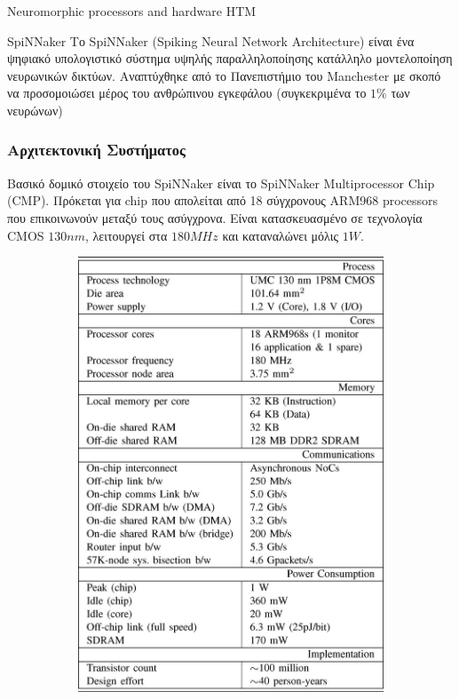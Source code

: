 \documentclass[a4paper,11pt]{article}
\begin{document}
\pagebreak
\begin{section}{Neuromorphic processors and hardware HTM}
  \begin{subsection}{SpiNNaker}
    Το SpiNNaker (Spiking Neural Network Architecture) είναι ένα ψηφιακό υπολογιστικό σύστημα υψηλής παραλληλοποίησης κατάλληλο μοντελοποίηση νευρωνικών δικτύων. Αναπτύχθηκε από το Πανεπιστήμιο του Manchester με σκοπό να προσομοιώσει μέρος του ανθρώπινου εγκεφάλου (συγκεκριμένα το $1\%$ των νευρώνων)
    \subsubsection{Αρχιτεκτονική Συστήματος}

    Βασικό δομικό στοιχείο του SpiNNaker είναι το SpiNNaker Multiprocessor Chip (CMP). Πρόκεται για chip που απολείται από 18 σύγχρονους ARM968 processors που επικοινωνούν μεταξύ τους ασύγχρονα. Είναι κατασκευασμένο σε τεχνολογία CMOS $130nm$, λειτουργεί στα $180ΜHz$ και καταναλώνει μόλις $1W$.
    \begin{figure} [H]
      \centering%
      \begin{subfigure}{0.5\columnwidth}
        \centering
        {\includegraphics[width=0.8\columnwidth,clip=true]{pics/CMPspecs.jpg}}

\end{subfigure}
\end{figure}
\end{subsection}
\end{section}
\end{document}
